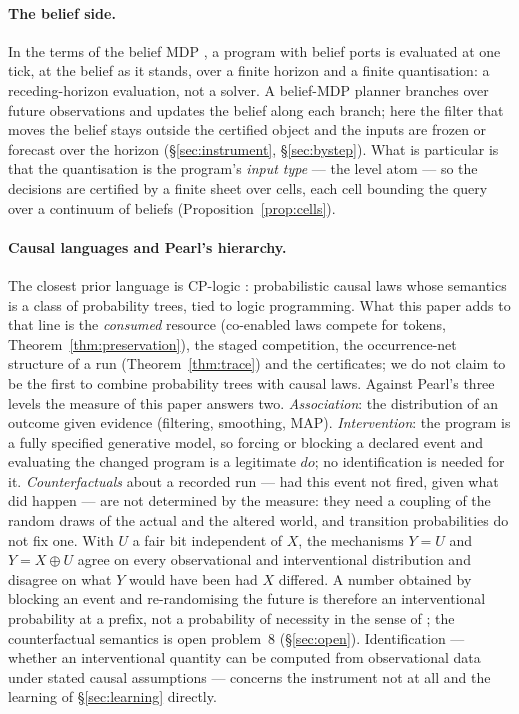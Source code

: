 \documentclass[11pt]{article}
\theoremstyle{plain}
\theoremstyle{definition}
\theoremstyle{remark}
\begin{document}
\paragraph{The belief side.} In the terms of the belief MDP
\cite{KLC98}, a program with belief ports is evaluated at one tick, at
the belief as it stands, over a finite horizon and a finite
quantisation: a receding-horizon evaluation, not a solver. A belief-MDP
planner branches over future observations and updates the belief along
each branch; here the filter that moves the belief stays outside the
certified object and the inputs are frozen or forecast over the horizon
(\S\ref{sec:instrument}, \S\ref{sec:bystep}). What is particular is
that the quantisation is the program's \emph{input type} --- the level
atom --- so the decisions are certified by a finite sheet over cells,
each cell bounding the query over a continuum of beliefs
(Proposition~\ref{prop:cells}).

\paragraph{Causal languages and Pearl's hierarchy.} The closest prior
language is CP-logic \cite{VDB09}: probabilistic causal laws whose
semantics is a class of probability trees, tied to logic programming.
What this paper adds to that line is the \emph{consumed} resource
(co-enabled laws compete for tokens, Theorem~\ref{thm:preservation}),
the staged competition, the occurrence-net structure of a run
(Theorem~\ref{thm:trace}) and the certificates; we do not claim to be
the first to combine probability trees with causal laws. Against
Pearl's three levels \cite{Pea09} the measure of this paper answers two.
\emph{Association}: the distribution of an outcome given evidence
(filtering, smoothing, MAP). \emph{Intervention}: the program is a
fully specified generative model, so forcing or blocking a declared
event and evaluating the changed program is a legitimate $\mathit{do}$;
no identification is needed for it. \emph{Counterfactuals} about a
recorded run --- had this event not fired, given what did happen ---
are not determined by the measure: they need a coupling of the random
draws of the actual and the altered world, and transition probabilities
do not fix one. With $U$ a fair bit independent of $X$, the mechanisms
$Y = U$ and $Y = X \oplus U$ agree on every observational and
interventional distribution and disagree on what $Y$ would have been
had $X$ differed. A number obtained by blocking an event and
re-randomising the future is therefore an interventional probability at
a prefix, not a probability of necessity in the sense of
\cite{TP00}; the counterfactual semantics is open problem~8
(\S\ref{sec:open}). Identification \cite{SP06} --- whether an
interventional quantity can be computed from observational data under
stated causal assumptions --- concerns the instrument not at all and
the learning of \S\ref{sec:learning} directly.
\end{document}
